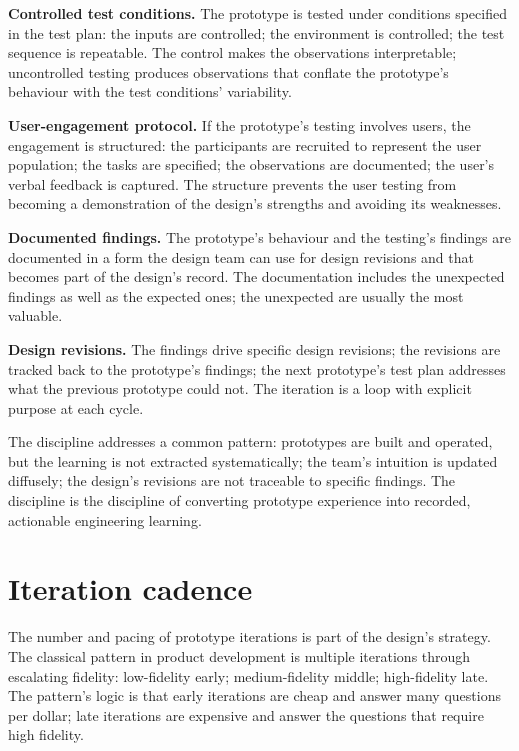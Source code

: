 \textbf{Controlled test conditions.} The prototype is tested under conditions specified in the test plan: the inputs are controlled; the environment is controlled; the test sequence is repeatable. The control makes the observations interpretable; uncontrolled testing produces observations that conflate the prototype's behaviour with the test conditions' variability.

\textbf{User-engagement protocol.} If the prototype's testing involves users, the engagement is structured: the participants are recruited to represent the user population; the tasks are specified; the observations are documented; the user's verbal feedback is captured. The structure prevents the user testing from becoming a demonstration of the design's strengths and avoiding its weaknesses.

\textbf{Documented findings.} The prototype's behaviour and the testing's findings are documented in a form the design team can use for design revisions and that becomes part of the design's record. The documentation includes the unexpected findings as well as the expected ones; the unexpected are usually the most valuable.

\textbf{Design revisions.} The findings drive specific design revisions; the revisions are tracked back to the prototype's findings; the next prototype's test plan addresses what the previous prototype could not. The iteration is a loop with explicit purpose at each cycle.

The discipline addresses a common pattern: prototypes are built and operated, but the learning is not extracted systematically; the team's intuition is updated diffusely; the design's revisions are not traceable to specific findings. The discipline is the discipline of converting prototype experience into recorded, actionable engineering learning.

\section{Iteration cadence}

The number and pacing of prototype iterations is part of the design's strategy. The classical pattern in product development is multiple iterations through escalating fidelity: low-fidelity early; medium-fidelity middle; high-fidelity late. The pattern's logic is that early iterations are cheap and answer many questions per dollar; late iterations are expensive and answer the questions that require high fidelity.

